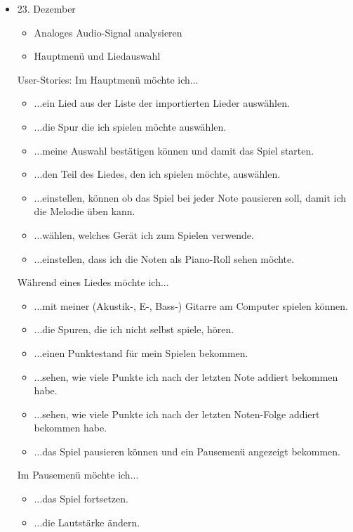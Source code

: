 \documentclass[12pt,a4paper]{report}
\begin{document}
\begin{itemize}
    \item 23. Dezember
      \begin{itemize}
      \item Analoges Audio-Signal analysieren
      \item Hauptmenü und Liedauswahl
      \end{itemize}
      User-Stories:
      Im Hauptmenü möchte ich...
      \begin{itemize}
      \item[P] ...ein Lied aus der Liste der importierten Lieder auswählen. 
      \item[P] ...die Spur die ich spielen möchte auswählen.
      \item[P] ...meine Auswahl bestätigen können und damit das Spiel starten.
      \item[P] ...den Teil des Liedes, den ich spielen möchte, auswählen.
      \item[P] ...einstellen, können ob das Spiel bei jeder Note pausieren soll, damit ich die Melodie üben kann.
      \item[P] ...wählen, welches Gerät ich zum Spielen verwende.
      \item[P] ...einstellen, dass ich die Noten als Piano-Roll sehen möchte.
      \end{itemize}   
      
      Während eines Liedes möchte ich...
      \begin{itemize}
      \item[D] ...mit meiner (Akustik-, E-, Bass-) Gitarre am Computer spielen können.
      
      \item[P] ...die Spuren, die ich nicht selbst spiele, hören.
      \item[P] ...einen Punktestand für mein Spielen bekommen.
      \item[P] ...sehen, wie viele Punkte ich nach der letzten Note addiert bekommen habe.
      \item[P] ...sehen, wie viele Punkte ich nach der letzten Noten-Folge addiert bekommen habe.
      \item[P] ...das Spiel pausieren können und ein Pausemenü angezeigt bekommen.
      \end{itemize}
      
      Im Pausemenü möchte ich...
      \begin{itemize}
      \item[P] ...das Spiel fortsetzen.
      \item[P] ...die Lautstärke ändern.
      \end{itemize}
      

\end{itemize}
\end{document}
